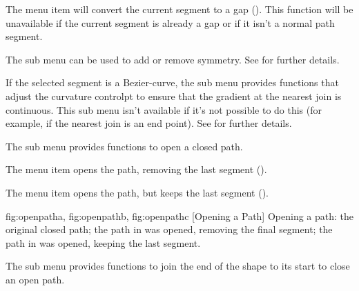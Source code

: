 
The  menu item will convert the
current segment to a \gls{gap} (). This function will be
unavailable if the current segment is already a \gls{gap} or if it
isn't a normal path segment.


The  sub menu can be used to add or remove
\gls{symmetry}.
See  for further details.


If the selected segment is a \gls{Bezier-curve}, the
 sub menu provides functions that adjust
the curvature \gls*{controlpt} to ensure that the gradient at the
nearest join is continuous. This sub menu isn't available if it's not
possible to do this (for example, if the nearest join is an end
point). See  for further details.


The  sub menu provides functions to open a
closed path.


The  menu item
opens the path, removing the last segment ().


The  menu item
opens the path, but keeps the last segment ().

{
 {fig:openpatha}{}{},
 {fig:openpathb}{}{},
 {fig:openpathc}{}{}
}
  [Opening a Path]
  {Opening a path:  the original closed path;
    the path in  was opened,
   removing the final segment;  the path in 
    was opened, keeping the last segment.}


The  sub menu provides functions to join
the end of the \gls{shape} to its start to close an open path.



